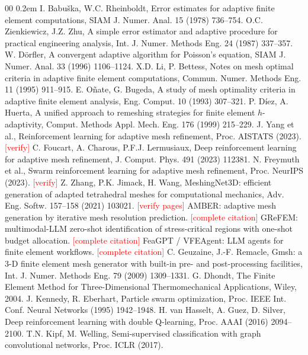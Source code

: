 \documentclass[preprint,12pt]{elsarticle}
\newcommand{\todo}[1]{\textcolor{red}{[#1]}}
\begin{document}
\begin{thebibliography}{00}
\small
\itemsep0.2em
 I. Babu\v{s}ka, W.C. Rheinboldt, Error estimates for adaptive
finite element computations, SIAM J. Numer. Anal. 15 (1978) 736--754.
 O.C. Zienkiewicz, J.Z. Zhu, A simple error estimator and adaptive
procedure for practical engineering analysis, Int. J. Numer. Methods Eng. 24 (1987)
337--357.
 W. D\"orfler, A convergent adaptive algorithm for Poisson's
equation, SIAM J. Numer. Anal. 33 (1996) 1106--1124.
 X.D. Li, P. Bettess, Notes on mesh optimal criteria in adaptive
finite element computations, Commun. Numer. Methods Eng. 11 (1995) 911--915.
 E. O\~nate, G. Bugeda, A study of mesh optimality criteria in
adaptive finite element analysis, Eng. Comput. 10 (1993) 307--321.
 P. D\'iez, A. Huerta, A unified approach to remeshing strategies for
finite element $h$-adaptivity, Comput. Methods Appl. Mech. Eng. 176 (1999) 215--229.
 J. Yang et al., Reinforcement learning for adaptive mesh refinement,
Proc. AISTATS (2023). \todo{verify}
 C. Foucart, A. Charous, P.F.J. Lermusiaux, Deep reinforcement
learning for adaptive mesh refinement, J. Comput. Phys. 491 (2023) 112381.
 N. Freymuth et al., Swarm reinforcement learning for adaptive mesh
refinement, Proc. NeurIPS (2023). \todo{verify}
 Z. Zhang, P.K. Jimack, H. Wang, MeshingNet3D: efficient
generation of adapted tetrahedral meshes for computational mechanics, Adv. Eng.
Softw. 157--158 (2021) 103021. \todo{verify pages}
 AMBER: adaptive mesh generation by iterative mesh resolution
prediction. \todo{complete citation}
 GReFEM: multimodal-LLM zero-shot identification of stress-critical
regions with one-shot budget allocation. \todo{complete citation}
 FeaGPT / VFEAgent: LLM agents for finite element workflows.
\todo{complete citation}
 C. Geuzaine, J.-F. Remacle, Gmsh: a 3-D finite element mesh generator
with built-in pre- and post-processing facilities, Int. J. Numer. Methods Eng. 79
(2009) 1309--1331.
 G. Dhondt, The Finite Element Method for Three-Dimensional
Thermomechanical Applications, Wiley, 2004.
 J. Kennedy, R. Eberhart, Particle swarm optimization, Proc. IEEE Int.
Conf. Neural Networks (1995) 1942--1948.
 H. van Hasselt, A. Guez, D. Silver, Deep reinforcement learning with
double Q-learning, Proc. AAAI (2016) 2094--2100.
 T.N. Kipf, M. Welling, Semi-supervised classification with graph
convolutional networks, Proc. ICLR (2017).
\end{thebibliography}
\end{document}
